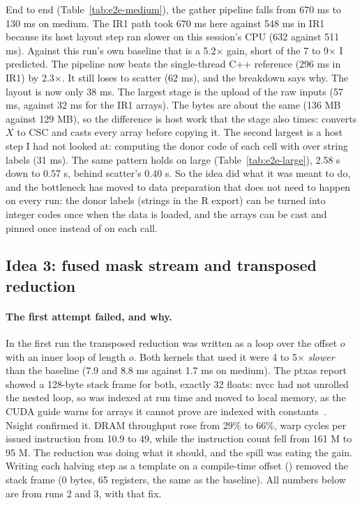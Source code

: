 End to end (Table~\ref{tab:e2e-medium}), the gather pipeline falls from 670 ms to 130 ms on medium. The
IR1 path took 670 ms here against 548 ms in IR1 because its host layout step ran slower on this session's
CPU (632 against 511 ms). Against this run's own baseline that is a 5.2$\times$ gain, short of the 7 to 9$\times$ I predicted.
The pipeline now beats the single-thread C++ reference (296 ms in IR1) by 2.3$\times$. It still loses to scatter (62 ms), and the breakdown says why. The layout
is now only 38 ms. The largest stage is the upload of the raw
inputs (57 ms, against 32 ms for the IR1 arrays). The bytes are about the same (136 MB against 129 MB), so
the difference is host work that the stage also times:  converts $X$ to CSC and casts every
array before copying it. The second
largest is a host step I had not looked at: computing the donor code of each cell with 
over string labels (31 ms). The same pattern holds on large (Table~\ref{tab:e2e-large}), 2.58 s down to
0.57 s, behind scatter's 0.40 s. So the idea did what it was meant to do, and the bottleneck has moved to
data preparation that does not need to happen on every run: the
donor labels (strings in the R export) can be turned into integer codes once when the data is loaded,
and the arrays can be cast and pinned once instead of on each call.

\subsection{Idea 3: fused mask stream and transposed reduction}

\paragraph{The first attempt failed, and why.}\label{sec:fail} In the first run the transposed reduction was written
as a loop over the offset $o$ with an inner loop of length $o$. Both kernels that used it were
4 to 5$\times$ \emph{slower} than the baseline (7.9 and 8.8 ms against 1.7 ms on medium). The ptxas
report showed a 128-byte stack frame for both, exactly 32 floats: nvcc had not unrolled the nested loop, so  was indexed at run time and moved to local memory,
as the CUDA guide warns for arrays it cannot prove are indexed with constants~\cite{cudaguide}. Nsight confirmed it. DRAM
throughput rose from 29\% to 66\%, warp cycles per issued instruction from 10.9 to 49, while the
instruction count fell from 161 M to 95 M. The reduction was doing what it should, and the spill was
eating the gain. Writing each halving step as a template on a compile-time offset ()
removed the stack frame (0 bytes, 65 registers, the same as the baseline). All numbers below are from runs 2 and 3, with that fix.

